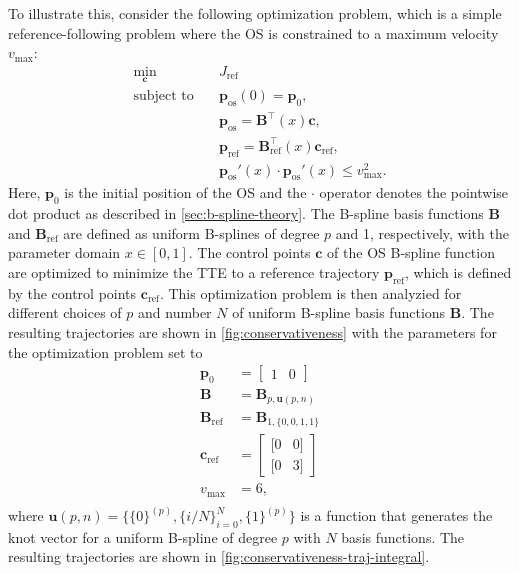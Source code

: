 To illustrate this, consider the following optimization problem, which is a simple reference-following problem where the OS is constrained to a maximum velocity $v_\text{max}$:
\begin{equation}\label{eq:conservativeness-optimization}
    \begin{aligned}
        \min_{\mathbf c} \quad & J_\text{ref} \\
        \text{subject to} \quad &\mathbf p_\text{os}(0) = \mathbf p_0, \\
                    &\mathbf p_\text{os} = \mathbf B^\top(x) \mathbf c, \\
                    &\mathbf p_\text{ref} = \mathbf B_\text{ref}^\top(x) \mathbf c_\text{ref}, \\
                    & \mathbf p_\text{os}'(x) \cdot \mathbf p_\text{os}'(x) \le v_\text{max}^2.
    \end{aligned}
\end{equation}
Here, $\mathbf p_0$ is the initial position of the OS and the $\cdot$ operator denotes the pointwise dot product as described in \cref{sec:b-spline-theory}. The B-spline basis functions $\mathbf B$ and $\mathbf B_\text{ref}$ are defined as uniform B-splines of degree $p$ and 1, respectively, with the parameter domain $x\in[0,1]$. The control points $\mathbf c$ of the OS B-spline function are optimized to minimize the TTE to a reference trajectory $\mathbf p_\text{ref}$, which is defined by the control points $\mathbf c_\text{ref}$.
This optimization problem is then analyzied for different choices of $p$ and number $N$ of uniform B-spline basis functions $\mathbf B$. The resulting trajectories are shown in \cref{fig:conservativeness} with the parameters for the optimization problem set to
\begin{equation}\label{eq:conservativeness-parameters}
    \begin{aligned}
        \mathbf p_0 &= \begin{bmatrix} 1 & 0 \end{bmatrix} \\
        \mathbf B &= \mathbf B_{p, \mathbf u(p,n)} \\
        \mathbf B_\text{ref} &= \mathbf B_{1,\{0, 0, 1, 1\}} \\
        \mathbf c_\text{ref} &= \begin{bmatrix}
            [0 & 0] \\
            [0 & 3]
        \end{bmatrix} \\
        v_\text{max} &= 6, \\
    \end{aligned}
\end{equation}
where $\mathbf u(p,n) = \{\{0\}^{(p)}, \{i/N\}_{i=0}^{N}, \{1\}^{(p)}\}$ is a function that generates the knot vector for a uniform B-spline of degree $p$ with $N$ basis functions. The resulting trajectories are shown in \cref{fig:conservativeness-traj-integral}.

